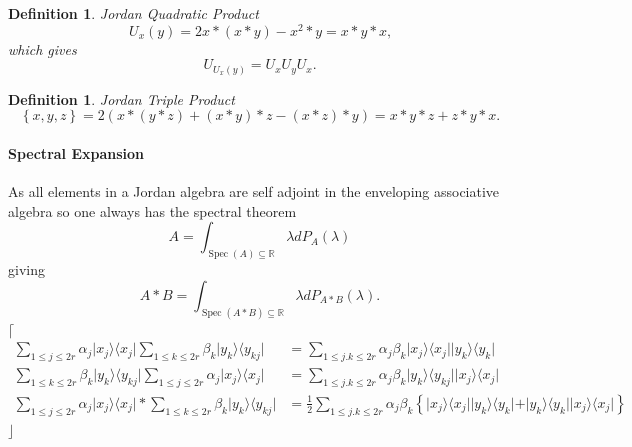 \documentclass[aps, preprint]{revtex4}
\newtheorem{definition}[theorem]{Definition}
\begin{document}
\begin{definition}
Jordan Quadratic Product
\begin{equation}U_{x} \left (y\right ) =2 x \ast \left (x \ast y\right ) -x^{2} \ast y =x \ast y \ast x\text{,}
\end{equation}which gives
\begin{equation}U_{U_{x} \left (y\right )} =U_{x} U_{y} U_{x}\text{.}
\end{equation}
\end{definition}


\begin{definition}
Jordan Triple Product
\begin{equation}\left \{x ,y ,z\right \} =2 \left (x \ast \left (y \ast z\right ) +\left (x \ast y\right ) \ast z -\left (x \ast z\right ) \ast y\right ) =x \ast y \ast z +z \ast y \ast x\text{.}
\end{equation}
\end{definition}

\paragraph{Spectral Expansion}
As all elements in a Jordan algebra are self adjoint in the enveloping associative algebra so one always has the spectral theorem
\begin{equation}A =\int _{\ensuremath{\operatorname*{Spec}} \left (A\right ) \subseteq \mathbb{R}}\lambda  d P_{A} \left (\lambda \right )
\end{equation}giving
\begin{equation}A \ast B =\int _{\ensuremath{\operatorname*{Spec}} \left (A \ast B\right ) \subseteq \mathbb{R}}\lambda  d P_{A \ast B} \left (\lambda \right )\text{.}
\end{equation}$\lceil $
\begin{align}\sum _{1 \leq j \leq 2 r}\alpha _{j}\vert x_{j} \rangle  \langle x_{j}\vert \sum _{1 \leq k \leq 2 r}\beta _{k}\vert y_{k} \rangle  \langle y_{k j}\vert  &  =\sum _{1 \leq j .k \leq 2 r}\alpha _{j} \beta _{k}\vert x_{j} \rangle  \langle x_{j}\vert \vert y_{k} \rangle  \langle y_{k}\vert  \\
\sum _{1 \leq k \leq 2 r}\beta _{k}\vert y_{k} \rangle  \langle y_{k j}\vert \sum _{1 \leq j \leq 2 r}\alpha _{j}\vert x_{j} \rangle  \langle x_{j}\vert  &  =\sum _{1 \leq j .k \leq 2 r}\alpha _{j} \beta _{k}\vert y_{k} \rangle  \langle y_{k j}\vert \vert x_{j} \rangle  \langle x_{j}\vert  \\
\sum _{1 \leq j \leq 2 r}\alpha _{j}\vert x_{j} \rangle  \langle x_{j}\vert  \ast \sum _{1 \leq k \leq 2 r} \beta _{k}\vert y_{k} \rangle  \langle y_{k j}\vert  &  =\frac{1}{2} \sum _{1 \leq j .k \leq 2 r}\alpha _{j} \beta _{k} \left \{\vert x_{j} \rangle  \langle x_{j}\vert \vert y_{k} \rangle  \langle y_{k}\vert  +\vert y_{k} \rangle  \langle y_{k}\vert \vert x_{j} \rangle  \langle x_{j}\vert \right \}\end{align}$\rfloor $ 
\end{document}
